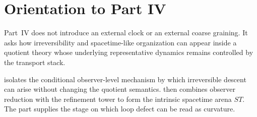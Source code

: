 \chapter*{Orientation to Part IV}
\label{part:intro-dynamics-spacetime}
\begin{chapterorientation}
\end{chapterorientation}

Part~IV does not introduce an external clock or an external coarse
graining.  It asks how irreversibility and spacetime-like organization
can appear inside a quotient theory whose underlying representative
dynamics remains controlled by the transport stack.

 isolates the conditional observer-level mechanism by
which irreversible descent can arise without changing the quotient
semantics.   then combines observer reduction with
the refinement tower to form the intrinsic spacetime arena \(ST\).  The
part supplies the stage on which loop defect can be read as curvature.
